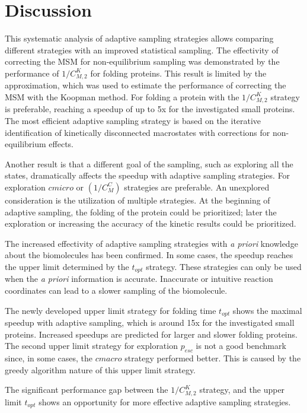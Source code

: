 \section{\label{sec:conclusion}Discussion}


This systematic analysis of adaptive sampling strategies allows comparing different strategies with an improved statistical sampling.
The effectivity of correcting the MSM for non-equilibrium sampling was demonstrated by the performance of $1/C_{M,2}^K$ for folding proteins. This result is limited by the approximation, which was used to estimate the performance of correcting the MSM with the Koopman method. For folding a protein with the $1/C_{M,2}^K$ strategy is preferable, reaching a speedup of up to 5x for the investigated small proteins. The most efficient adaptive sampling strategy is based on the iterative identification of kinetically disconnected macrostates with corrections for non-equilibrium effects.

Another result is that a different goal of the sampling, such as exploring all the states, dramatically affects the speedup with adaptive sampling strategies. For exploration $cmicro$ or  $(1/C_M^C)$ strategies are preferable. 
An unexplored consideration is the utilization of multiple strategies. At the beginning of adaptive sampling, the folding of the protein could be prioritized; later the exploration or increasing the accuracy of the kinetic results could be prioritized.

The increased effectivity of adaptive sampling strategies with \emph{a priori} knowledge about the biomolecules has been confirmed. In some cases, the speedup reaches the upper limit determined by the $t_{opt}$ strategy. These strategies can only be used when the \emph{a priori} information is accurate. Inaccurate or intuitive reaction coordinates can lead to a slower sampling of the biomolecule.

The newly developed upper limit strategy for folding time $t_{opt}$ shows the maximal speedup with adaptive sampling, which is around 15x for the investigated small proteins. Increased speedups are predicted for larger and slower folding proteins. The second upper limit strategy for exploration $p_{esc}$ is not a good benchmark since, in some cases, the $cmacro$ strategy performed better. This is caused by the greedy algorithm nature of this upper limit strategy.

The significant performance gap between the $1/C_{M,2}^K$ strategy, and the upper limit $t_{opt}$ shows an opportunity for more effective adaptive sampling strategies.

